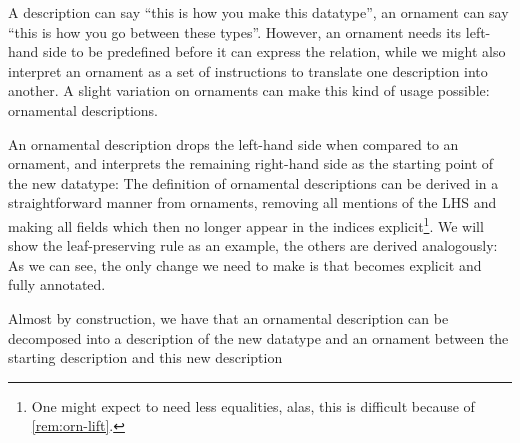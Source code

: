 \begin{outline}
A description can say ``this is how you make this datatype'', an ornament can say ``this is how you go between these types''. However, an ornament needs its left-hand side to be predefined before it can express the relation, while we might also interpret an ornament as a set of instructions to translate one description into another. A slight variation on ornaments can make this kind of usage possible: ornamental descriptions.
    
An ornamental description drops the left-hand side when compared to an ornament, and interprets the remaining right-hand side as the starting point of the new datatype:
The definition of ornamental descriptions can be derived in a straightforward manner from ornaments, removing all mentions of the LHS and making all fields which then no longer appear in the indices explicit\footnote{One might expect to need less equalities, alas, this is difficult because of \autoref{rem:orn-lift}.}. We will show the leaf-preserving rule as an example, the others are derived analogously:
As we can see, the only change we need to make is that  becomes explicit and fully annotated.

Almost by construction, we have that an ornamental description can be decomposed into a description of the new datatype
and an ornament between the starting description and this new description
\end{outline}